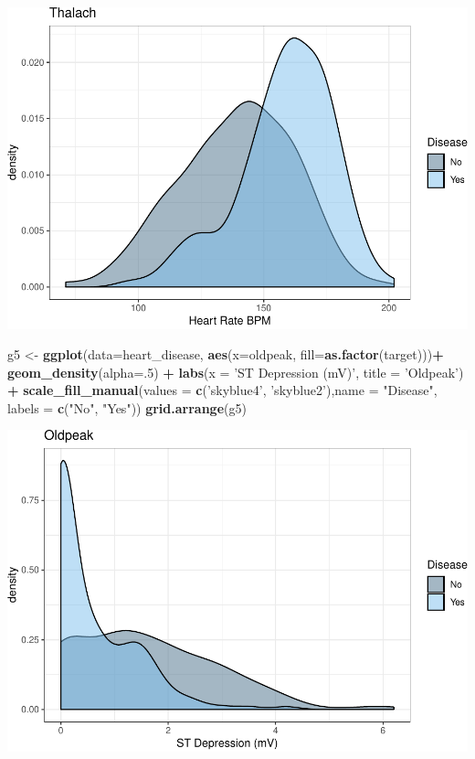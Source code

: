\documentclass[]{article}
\newenvironment{Shaded}{\begin{snugshade}}{\end{snugshade}}
\newcommand{\KeywordTok}[1]{\textcolor[rgb]{0.13,0.29,0.53}{\textbf{#1}}}
\newcommand{\DataTypeTok}[1]{\textcolor[rgb]{0.13,0.29,0.53}{#1}}
\newcommand{\DecValTok}[1]{\textcolor[rgb]{0.00,0.00,0.81}{#1}}
\newcommand{\StringTok}[1]{\textcolor[rgb]{0.31,0.60,0.02}{#1}}
\newcommand{\OperatorTok}[1]{\textcolor[rgb]{0.81,0.36,0.00}{\textbf{#1}}}
\newcommand{\NormalTok}[1]{#1}
\begin{document}
\includegraphics{project_report_files/figure-latex/unnamed-chunk-6-2.pdf}

\begin{Shaded}
\begin{Highlighting}[]
\NormalTok{g5 <-}\StringTok{ }\KeywordTok{ggplot}\NormalTok{(}\DataTypeTok{data=}\NormalTok{heart_disease, }\KeywordTok{aes}\NormalTok{(}\DataTypeTok{x=}\NormalTok{oldpeak, }\DataTypeTok{fill=}\KeywordTok{as.factor}\NormalTok{(target)))}\OperatorTok{+}
\StringTok{  }\KeywordTok{geom_density}\NormalTok{(}\DataTypeTok{alpha=}\NormalTok{.}\DecValTok{5}\NormalTok{) }\OperatorTok{+}
\StringTok{  }\KeywordTok{labs}\NormalTok{(}\DataTypeTok{x =} \StringTok{'ST Depression (mV)'}\NormalTok{, }\DataTypeTok{title =} \StringTok{'Oldpeak'}\NormalTok{) }\OperatorTok{+}
\StringTok{  }\KeywordTok{scale_fill_manual}\NormalTok{(}\DataTypeTok{values =} \KeywordTok{c}\NormalTok{(}\StringTok{'skyblue4'}\NormalTok{, }\StringTok{'skyblue2'}\NormalTok{),}\DataTypeTok{name =} \StringTok{"Disease"}\NormalTok{, }\DataTypeTok{labels =} \KeywordTok{c}\NormalTok{(}\StringTok{"No"}\NormalTok{, }\StringTok{"Yes"}\NormalTok{))}
\KeywordTok{grid.arrange}\NormalTok{(g5)}
\end{Highlighting}
\end{Shaded}

\includegraphics{project_report_files/figure-latex/unnamed-chunk-7-1.pdf}
\end{document}
